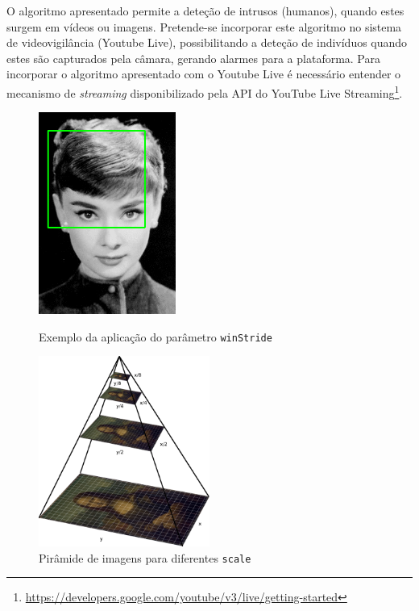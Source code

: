 O algoritmo apresentado permite a deteção de intrusos (humanos), quando estes surgem em vídeos ou imagens. Pretende-se incorporar este algoritmo no sistema de videovigilância (Youtube Live), possibilitando a deteção de indivíduos quando estes são capturados pela câmara, gerando alarmes para a plataforma. Para incorporar o algoritmo apresentado com o Youtube Live é necessário entender o mecanismo de \textit{streaming} disponibilizado pela \ac{API} do YouTube Live Streaming\footnote{\url{https://developers.google.com/youtube/v3/live/getting-started}}.  


\newpage

\begin{figure}[h]
	\centering
	\begin{minipage}[b]{0.49\textwidth}
		\centering
		\includegraphics[width=0.4\textwidth]{img/sliding_window_example-11.png}
		\caption{Exemplo da aplicação do parâmetro \texttt{winStride} }
		\label{winStride}
	\end{minipage}
	\hfill
	\begin{minipage}[b]{0.49\textwidth}
		\centering
		\includegraphics[width=0.5\textwidth]{img/pyramid.png}
		\caption{Pirâmide de imagens para diferentes \texttt{scale}}
		\label{scale}
	\end{minipage}
	
\end{figure}







